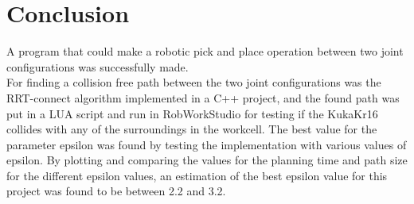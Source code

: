 \documentclass[11pt]{article}
\begin{document}
\newpage
\section{Conclusion}
A program that could make a robotic pick and place operation between two joint configurations was successfully made.\\[0.2cm]
\noindent For finding a collision free path between the two joint configurations was the RRT-connect algorithm implemented in a C++ project, and the found path was put in a LUA script and run in RobWorkStudio for testing if the KukaKr16 collides with any of the surroundings in the workcell. The best value for the parameter epsilon was found by testing the implementation with various values of epsilon. By plotting and comparing the values for the planning time and path size for the different epsilon values, an estimation of the best epsilon value for this project was found to be between 2.2 and 3.2.
\end{document}
